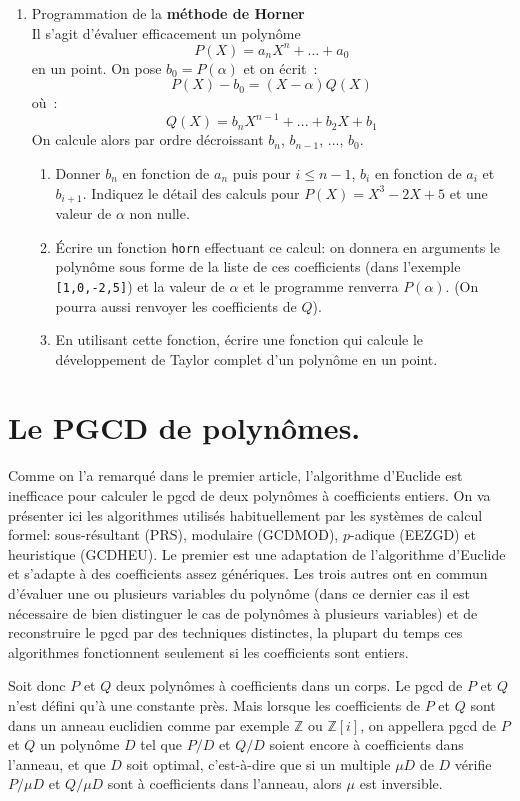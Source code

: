 \documentclass[a4paper,11pt]{article}
\begin{document}
\begin{enumerate}
\item Programmation de la {\bf m\'ethode de Horner}\\
Il s'agit d'\'evaluer efficacement un polyn\^ome 
\[ P(X) = a_n X^n + ... + a_0 \]
en un point.
On pose $b_0=P(\alpha )$ et on \'ecrit~:
\[ P(X)-b_0=(X-\alpha )Q(X) \]
o\`u~:
\[ Q(X) = b_n X^{n-1} + ... +b_2 X + b_1 \]
On calcule alors par ordre d\'ecroissant $b_n$, $b_{n-1}$, ..., $b_0$.
\begin{enumerate}
\item
Donner $b_n$ en fonction de $a_n$ puis pour $i\leq n-1$, $b_i$
en fonction de $a_i$ et $b_{i+1}$. Indiquez le d\'etail des calculs
pour $P(X)=X^3-2X+5$ et une valeur de $\alpha $ non nulle.
\item \'Ecrire un fonction \verb|horn| effectuant ce calcul:
on donnera en arguments le polyn\^ome sous forme de la
liste de ces coefficients (dans l'exemple \verb|[1,0,-2,5]|) et la
valeur de $\alpha $ et le programme renverra $P(\alpha )$.
(On pourra aussi renvoyer les coefficients de $Q$).
\item
En utilisant cette fonction, \'ecrire une fonction qui calcule
le d\'eveloppement de Taylor complet d'un polyn\^ome en un point.
\end{enumerate}


\end{enumerate}
\pagebreak

\section{Le PGCD de polynômes.} \label{sec:pgcd} 
Comme on l'a remarqué dans le premier article, l'algorithme d'Euclide est
inefficace pour calculer le pgcd de deux polynômes à coefficients entiers. On
va présenter ici les algorithmes utilisés habituellement par les systèmes de
calcul formel: sous-résultant (PRS), modulaire (GCDMOD), $p$-adique (EEZGD) et
heuristique (GCDHEU). Le premier est une adaptation de l'algorithme d'Euclide
et s'adapte à des coefficients assez génériques. Les trois autres ont en
commun d'évaluer une ou plusieurs variables du polynôme (dans ce dernier cas
il est nécessaire de bien distinguer le cas de polynômes à plusieurs
variables) et de reconstruire le pgcd par des techniques distinctes, la
plupart du temps ces algorithmes fonctionnent seulement si les coefficients
sont entiers.

Soit donc $ P$ et $Q$ deux polynômes à coefficients dans un corps. Le
pgcd de $P$ et $Q$ n'est défini qu'à une constante près. Mais lorsque les
coefficients de $P$ et $Q$ sont dans un anneau euclidien comme par exemple
$\mathbb{Z}$ ou
$\mathbb{Z}[ i ]$, on appellera pgcd de $P$ et $Q$ un polynôme $D$ tel
que $P / D$ et $Q / D$ soient encore à coefficients dans l'anneau, et que $D$
soit optimal, c'est-à-dire que si un multiple $\mu D$ de $D$ vérifie $P / \mu
D$ et $Q / \mu D$ sont à coefficients dans l'anneau, alors $\mu$ est
inversible. 
\end{document}
